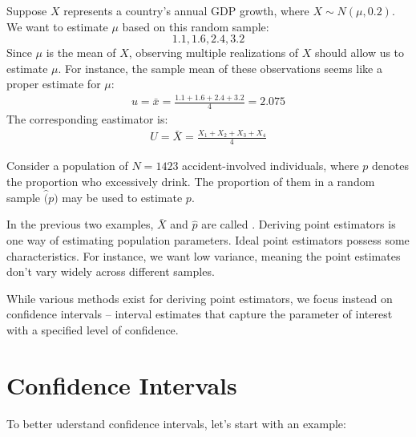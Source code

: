\begin{exmp}
    Suppose \( X \) represents a country's annual GDP growth, where \( X \sim N(\mu, 0.2) \).
    We want to estimate \( \mu \) based on this random sample:
    \[ 1.1, 1.6, 2.4, 3.2 \]
    Since \( \mu \) is the mean of \( X \), observing multiple realizations of \( X \) should allow us to estimate \( \mu \).
    For instance, the sample mean of these observations seems like a proper estimate for \( \mu \):
    \begin{gather*}
        u = \bar{x} = \frac{1.1 + 1.6 + 2.4 + 3.2}{4} = 2.075
    \end{gather*}
    The corresponding eastimator is:
    \begin{gather*}
        U = \bar{X} = \frac{X_1 + X_2 + X_3 + X_4}{4}
    \end{gather*}
\end{exmp}
\begin{exmp}
    Consider a population of \( N = 1423 \) accident-involved individuals, where \( p \) denotes the proportion who excessively drink.
    The proportion of them in a random sample \( \hat(p) \) may be used to estimate \( p \).
\end{exmp}
In the previous two examples, \( \bar{X} \) and \( \hat{p} \) are called .
Deriving point estimators is one way of estimating population parameters.
Ideal point estimators possess some characteristics.
For instance, we want low variance, meaning the point estimates don't vary widely across different samples.

While various methods exist for deriving point estimators, we focus instead on confidence intervals – interval estimates that capture the parameter of interest with a specified level of confidence.

\section{Confidence Intervals}

To better uderstand confidence intervals, let's start with an example:

